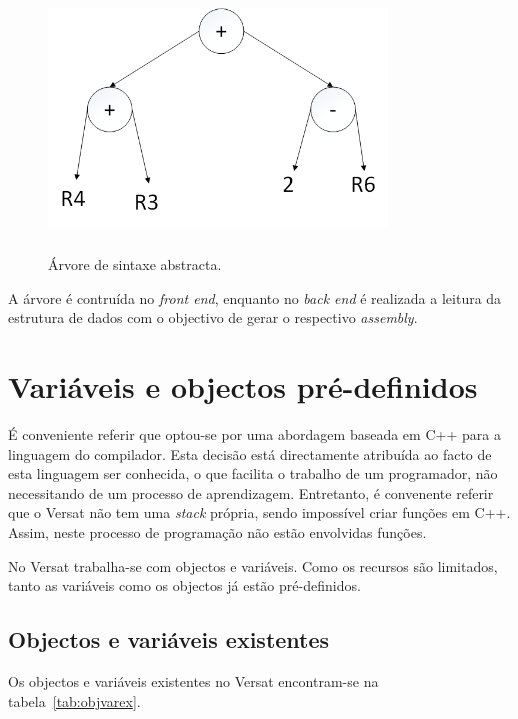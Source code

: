 \begin{figure}[!htb]
  \centering
  \includegraphics[height=70mm, width=90mm]{Figures/abstract_syntax_tree.png}
  \caption[Árvore de sintaxe abstracta.]{Árvore de sintaxe abstracta.}  
  \label{fig:arvore asa}
\end{figure}

A árvore é contruída no {\it front end}, enquanto no {\it back end} é realizada a leitura da estrutura de dados com o objectivo de gerar o respectivo {\it assembly}.


\chapter{Variáveis e objectos pré-definidos}
\label{section:Linguagem definida}


É conveniente referir que optou-se por uma abordagem baseada em C++ para a linguagem do compilador. Esta decisão está directamente atribuída ao
facto de esta linguagem ser conhecida, o que facilita o trabalho de um programador, não necessitando de um processo de aprendizagem. Entretanto,
é convenente referir que o Versat não tem uma {\it stack} própria, sendo impossível criar funções em C++. Assim, neste processo de
programação não estão envolvidas funções.

No Versat trabalha-se com objectos e variáveis. Como os recursos são limitados, tanto as variáveis como os objectos já estão pré-definidos.


\section{Objectos e variáveis existentes}
\label{section:objectos existentes}

Os objectos e variáveis existentes no Versat encontram-se na tabela~\ref{tab:objvarex}.

